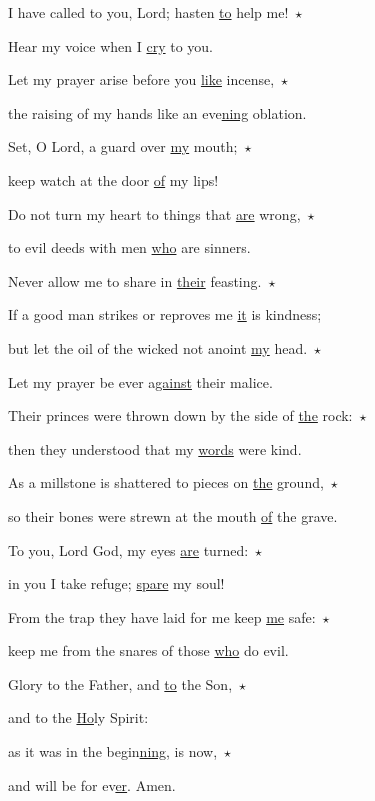 \noindent I have called to you, Lord; hasten \uline{to} help me!~$\star$~\nopagebreak

Hear my voice when I \uline{cry} to you.

\noindent Let my prayer arise before you \uline{like} incense,~$\star$~\nopagebreak

the raising of my hands like an eve\uline{ning} oblation.

\noindent Set, O Lord, a guard over \uline{my} mouth;~$\star$~\nopagebreak

keep watch at the door \uline{of} my lips!

\noindent Do not turn my heart to things that \uline{are} wrong,~$\star$~\nopagebreak

to evil deeds with men \uline{who} are sinners.

\noindent Never allow me to share in \uline{their} feasting.~$\star$~\nopagebreak

If a good man strikes or reproves me \uline{it} is kindness;

\noindent but let the oil of the wicked not anoint \uline{my} head.~$\star$~\nopagebreak

Let my prayer be ever a\uline{gainst} their malice.

\noindent Their princes were thrown down by the side of \uline{the} rock:~$\star$~\nopagebreak

then they understood that my \uline{words} were kind.

\noindent As a millstone is shattered to pieces on \uline{the} ground,~$\star$~\nopagebreak

so their bones were strewn at the mouth \uline{of} the grave.

\noindent To you, Lord God, my eyes \uline{are} turned:~$\star$~\nopagebreak

in you I take refuge; \uline{spare} my soul!

\noindent From the trap they have laid for me keep \uline{me} safe:~$\star$~\nopagebreak

keep me from the snares of those \uline{who} do evil.

\noindent Glory to the Father, and \uline{to} the Son,~$\star$~\nopagebreak

and to the \uline{Ho}ly Spirit:

\noindent as it was in the begin\uline{ning}, is now,~$\star$~\nopagebreak

and will be for ev\uline{er}. Amen.